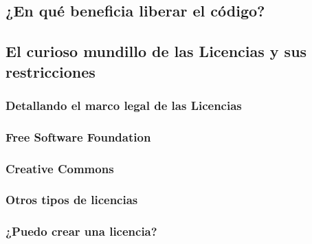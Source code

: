 \subsection{¿En qué beneficia liberar el código?}

\subsection{El curioso mundillo de las Licencias y sus restricciones}

\subsubsection{Detallando el marco legal de las Licencias}

\subsubsection{Free Software Foundation}

\subsubsection{Creative Commons}

\subsubsection{Otros tipos de licencias}

\subsubsection{¿Puedo crear una licencia?}
